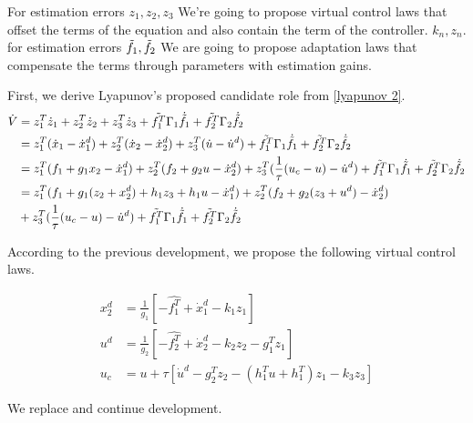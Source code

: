 For estimation errors $z_1, z_2,z_3$ We're going to propose virtual control laws that offset the terms of the equation and also contain the term of the controller. $k_n, z_n$. for estimation errors $ \Tilde{f_1}, \Tilde{f_2}$ We are going to propose adaptation laws that compensate the terms through parameters with estimation gains. 

First, we derive Lyapunov's proposed candidate role from \ref{lyapunov 2}. 
\begin{align}
       \dot V &= z^T_1 \dot z_1 + z^T_2 \dot z_2 + z^T_3 \dot z_3 + \Tilde{f_1^T}  \Gamma_1 \dot{\Tilde{f_1}} + \Tilde{f_2^T} \Gamma_2 \dot{\Tilde{f_2}} \nonumber \\
        &= z^T_1 (\dot x_1 - \dot x^d_1) + z^T_2 (\dot x_2 - \dot x^d_2) + z^T_3 (\dot u - \dot u^d) + \Tilde{f_1^T}  \Gamma_1 \dot{\Tilde{f_1}} + \Tilde{f_2^T} \Gamma_2 \dot{\Tilde{f_2}} \nonumber \\ 
    &= z^T_1 (f_1 + g_{1} x_2 - \dot x^d_1) + z^T_2 (f_2 + g_{2} u - \dot x^d_2) + z^T_3 (\frac{1}{\tau}(u_c - u) - \dot u^d) + \Tilde{f_1^T}  \Gamma_1 \dot{\Tilde{f_1}} + \Tilde{f_2^T} \Gamma_2 \dot{\Tilde{f_2}} \nonumber \\
    &= z^T_1 (f_1 + g_{1} (z_2 + x_{2}^d)  + h_1 z_3 + h_1 u - \dot x^d_1) + z^T_2 (f_2 + g_{2} (z_3 + u^d) - \dot x^d_2)  \nonumber \\
    &+ z^T_3 (\frac{1}{\tau}(u_c - u) - \dot u^d) + \Tilde{f_1^T}  \Gamma_1 \dot{\Tilde{f_1}} + \Tilde{f_2^T} \Gamma_2 \dot{\Tilde{f_2}}
\end{align}


According to the previous development, we propose the following virtual control laws. 

\begin{align}
    x^d_2 &= \frac{1}{g_{1}} [- \hat{f_1^T} + \dot x^d_1 - k_1 z_1] \nonumber \\
    u^d &= \frac{1}{g_{2}} [- \hat{f_2^T} + \dot x_{2}^d - k_2 z_2 - g_{1}^T z_1] \nonumber \\
    u_c &= u + \tau [\dot u^d - g_{2}^T z_2 - (h_1^Tu + h_1^T)z_1 - k_3 z_3]
\end{align}

We replace and continue development.  

